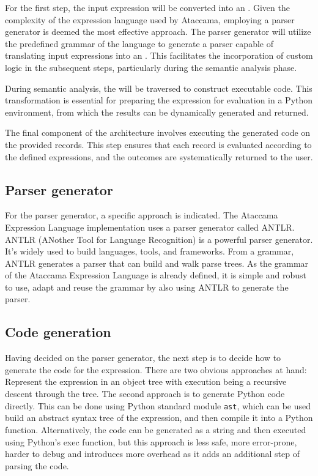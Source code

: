 For the first step, the input expression will be converted into an . Given the complexity of the expression language used by Ataccama, employing a parser generator is deemed the most effective approach. The parser generator will utilize the predefined grammar of the language to generate a parser capable of translating input expressions into an . This facilitates the incorporation of custom logic in the subsequent steps, particularly during the semantic analysis phase.

During semantic analysis, the  will be traversed to construct executable code. This transformation is essential for preparing the expression for evaluation in a Python environment, from which the results can be dynamically generated and returned.

The final component of the architecture involves executing the generated code on the provided records. This step ensures that each record is evaluated according to the defined expressions, and the outcomes are systematically returned to the user.

\subsection{Parser generator}

For the parser generator, a specific approach is indicated. The Ataccama Expression Language implementation uses a parser generator called ANTLR. ANTLR (ANother Tool for Language Recognition) is a powerful parser generator\cite{antlr}. It's widely used to build languages, tools, and frameworks. From a grammar, ANTLR generates a parser that can build and walk parse trees\cite{antlr4docs}. As the grammar of the Ataccama Expression Language is already defined, it is simple and robust to use, adapt and reuse the grammar by also using ANTLR to generate the parser. 

\subsection{Code generation}

Having decided on the parser generator, the next step is to decide how to generate the code for the expression. There are two obvious approaches at hand: Represent the expression in an object tree with execution being a recursive descent through the tree. The second approach is to generate Python code directly. This can be done using Python standard module \texttt{ast}, which can be used build an abstract syntax tree of the expression, and then compile it into a Python function. Alternatively, the code can be generated as a string and then executed using Python's exec function, but this approach is less safe, more error-prone, harder to debug and introduces more overhead as it adds an additional step of parsing the code.

